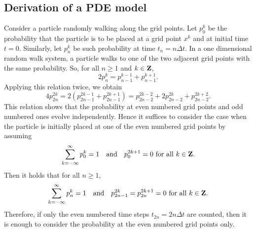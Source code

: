 \documentclass[11pt]{amsart}
\def\Z{{\bf Z}}
\begin{document}
\subsection{Derivation of a PDE model}

Consider a particle randomly walking along the grid points. Let $p_0^k$ be the probability that the particle is to be placed at a grid point $x^k$ and at initial time $t=0$. Similarly, let $p_n^k$ be such probability at time $t_n=n\Delta t$. In a one dimensional random walk system, a particle walks to one of the two adjacent grid points with the same probability. So, for all $n\geq 1$ and $k\in\Z$,
\begin{equation*}\label{pnk}
2p_n^k = p_{n-1}^{k-1} + p_{n-1}^{k+1}.
\end{equation*}
Applying this relation twice, we obtain
\begin{equation}\label{p2n2k}
4p_{2n}^{2k}=2(p_{2n-1}^{2k-1} + p_{2n-1}^{2k+1}) =p_{2n-2}^{2k-2}+2p_{2n-2}^{2k}+p_{2n-2}^{2k+2}.
\end{equation}
This relation shows that the probability at even numbered grid points and odd numbered ones evolve independently. Hence it suffices to consider the case when the particle is initially placed at one of the even numbered grid points by assuming
\begin{equation}\label{p0Odd}
\sum_{k=-\infty}^\infty p_0^k=1\quad\text{and}\quad p^{2k+1}_0=0 \text{~for all $k\in\Z$}.
\end{equation}
Then it holds that for all $n\geq 1$,
\begin{equation*}\label{p0Even}
\sum_{k=-\infty}^\infty p_n^k=1\quad\text{and}\quad p^{2k}_{2n-1}=p^{2k+1}_{2n}=0 \text{~for all $k\in\Z$.}
\end{equation*}
Therefore, if only the even numbered time steps $t_{2n}=2n\Delta t$ are counted, then it is enough to consider the probability at the even numbered grid points only.
\end{document}
